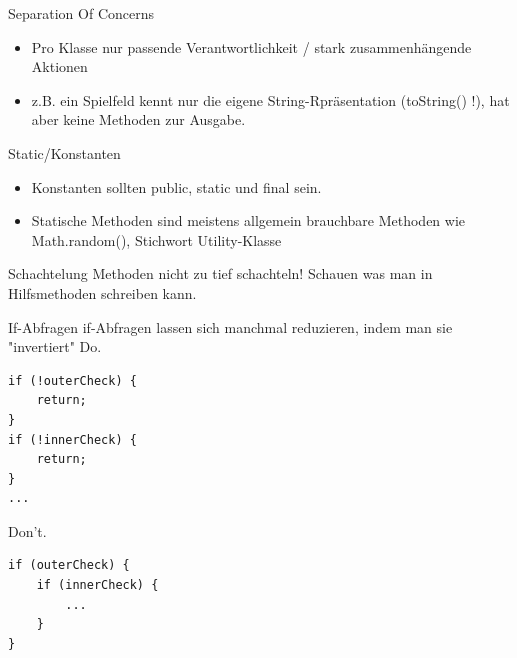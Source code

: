 \documentclass[aspectratio=169]{beamer}
\begin{document}
\begin{frame}
  \begin{block}{Separation Of Concerns}
    \begin{itemize}
      \pause
      \item Pro Klasse nur passende Verantwortlichkeit / stark zusammenhängende Aktionen
      \pause
      \item z.B. ein Spielfeld kennt nur die eigene String-Rpräsentation (toString() !), hat aber keine Methoden zur Ausgabe.
    \end{itemize}
  \end{block}
  \pause
  \begin{block}{Static/Konstanten}
    \begin{itemize}
      \pause
      \item Konstanten sollten 
      \color{keywordcolor}public\color{FGround}, \color{keywordcolor}static \color{FGround} und \color{keywordcolor}final \color{FGround} sein.
      \pause
      \item Statische Methoden sind meistens allgemein brauchbare Methoden wie Math.random(), Stichwort Utility-Klasse
    \end{itemize}
  \end{block}
  \pause
  \begin{block}{Schachtelung}
    Methoden nicht zu tief schachteln! Schauen was man in Hilfsmethoden schreiben kann.
  \end{block}
\end{frame}

\begin{frame}[fragile]
  \begin{block}{If-Abfragen}
    \color{keywordcolor}if\color{FGround}-Abfragen lassen sich manchmal reduzieren, indem man sie "invertiert" \linebreak
    \pause
    \color{nicegreen}Do.\color{FGround}
    \begin{lstlisting}[numbers=none]
if (!outerCheck) { 
    return; 
} 
if (!innerCheck) { 
    return; 
} 
...
    \end{lstlisting}
    \pause
    \color{alertcolor}Don't.\color{FGround}
    \begin{lstlisting}[numbers=none]
if (outerCheck) { 
    if (innerCheck) { 
        ... 
    } 
}
    \end{lstlisting}
  \end{block}
\end{frame}
\end{document}
